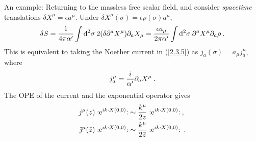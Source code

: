 An example: Returning to the massless free scalar field, and consider \emph{spacetime} translations $\delta X^{\mu}=\epsilon a^{\mu}$.    
Under $\delta X^{\mu}(\sigma)=\epsilon \rho(\sigma) a^{\mu}$,    
\begin{align}
	\delta S=\frac{1}{4 \pi \alpha^{\prime}} \int \mathrm{d}^{2}\sigma\: 2(\delta \partial^{a} X^{\mu}) \partial_{a} X_{\mu} 
	=\frac{\epsilon a_{\mu}}{2 \pi \alpha^{\prime}} \int \mathrm{d}^{2} \sigma \:\partial^{a} X^{\mu} \partial_{a} \rho \:.
\end{align}
This is equivalent to taking the Noether current in (\ref{2.3.5}) as $j_{a}(\sigma)=a_{\mu} j_{a}^{\mu}$, where    
\begin{equation}
	j_{a}^{\mu}=\frac{i}{\alpha^{\prime}} \partial_{a} X^{\mu} \:. \label{2.3.13}
\end{equation}
The OPE of the current and the exponential operator gives    
\begin{subequations} \label{2.3.14}
	\begin{align}
		j^{\mu}(z): \mathrel{\mathrm{e}^{i k \cdot X(0,0)}}: &\sim \frac{k^{\mu}}{2 z}: \mathrel{\mathrm{e}^{i k \cdot X(0,0)}}:  \:,\label{2.3.14a} \\
		\tilde{\jmath}^{\mu}(\bar{z}):\mathrel{ \mathrm{e}^{i k \cdot X(0,0)}}: &\sim \frac{k^{\mu}}{2 \bar{z}}: 
		\mathrel{\mathrm{e}^{i k \cdot X(0,0)}}:\:.
		\label{2.3.14b}
	\end{align}
\end{subequations}

